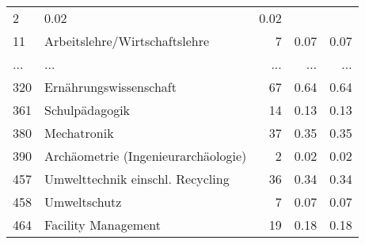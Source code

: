 \begin{longtable}{lXrrr}
          \num{2} &
          \num[round-mode=places,round-precision=2]{0.02} &
          \num[round-mode=places,round-precision=2]{0.02} \\
        11 & \multicolumn{1}{X}{Arbeitslehre/Wirtschaftslehre} & %
          \num{7} &
          \num[round-mode=places,round-precision=2]{0.07} &
          \num[round-mode=places,round-precision=2]{0.07} \\
       ... & ... & ... & ... & ... \\
        320 & \multicolumn{1}{X}{Ernährungswissenschaft} & %
          \num{67} &
          \num[round-mode=places,round-precision=2]{0.64} &
          \num[round-mode=places,round-precision=2]{0.64} \\

        361 & \multicolumn{1}{X}{Schulpädagogik} & %
          \num{14} &
          \num[round-mode=places,round-precision=2]{0.13} &
          \num[round-mode=places,round-precision=2]{0.13} \\

        380 & \multicolumn{1}{X}{Mechatronik} & %
          \num{37} &
          \num[round-mode=places,round-precision=2]{0.35} &
          \num[round-mode=places,round-precision=2]{0.35} \\

        390 & \multicolumn{1}{X}{Archäometrie (Ingenieurarchäologie)} & %
          \num{2} &
          \num[round-mode=places,round-precision=2]{0.02} &
          \num[round-mode=places,round-precision=2]{0.02} \\

        457 & \multicolumn{1}{X}{Umwelttechnik einschl. Recycling} & %
          \num{36} &
          \num[round-mode=places,round-precision=2]{0.34} &
          \num[round-mode=places,round-precision=2]{0.34} \\

        458 & \multicolumn{1}{X}{Umweltschutz} & %
          \num{7} &
          \num[round-mode=places,round-precision=2]{0.07} &
          \num[round-mode=places,round-precision=2]{0.07} \\

        464 & \multicolumn{1}{X}{Facility Management} & %
          \num{19} &
          \num[round-mode=places,round-precision=2]{0.18} &
          \num[round-mode=places,round-precision=2]{0.18} \\


\end{longtable}

